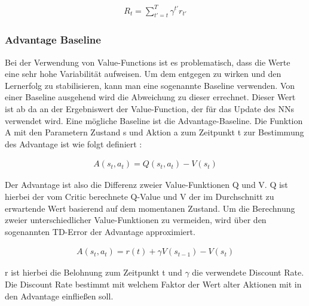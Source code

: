 \documentclass[12pt,a4paper]{article}
\begin{document}
\begin{eqnarray}
	R_{t} = \sum_{t'=t}^{T} \gamma^{t'}r_{t'}
\end{eqnarray}

\subsubsection{Advantage Baseline}
Bei der Verwendung von Value-Functions ist es problematisch, dass die Werte eine sehr hohe Variabilität aufweisen. Um dem entgegen zu wirken und den Lernerfolg zu stabilisieren, kann man eine sogenannte Baseline verwenden. Von einer Baseline ausgehend wird die Abweichung zu dieser errechnet. Dieser Wert ist ab da an der Ergebniswert der Value-Function, der für das Update des NNs verwendet wird. Eine mögliche Baseline ist die Advantage-Baseline. Die Funktion A mit den Parametern Zustand s und Aktion a zum Zeitpunkt t zur Bestimmung des Advantage ist wie folgt definiert \cite{towardsdatascience:actor_critic}:

\begin{eqnarray}
	A(s_{t}, a_{t}) = Q(s_{t}, a_{t}) - V(s_{t})
\end{eqnarray}

Der Advantage ist also die Differenz zweier Value-Funktionen Q und V. Q ist hierbei der vom Critic berechnete Q-Value und V der im Durchschnitt zu erwartende Wert basierend auf dem momentanen Zustand. Um die Berechnung zweier unterschiedlicher Value-Funktionen zu vermeiden, wird über den sogenannten TD-Error der Advantage approximiert.

\begin{eqnarray}
	A(s_{t}, a_{t}) = r(t) + \gamma V(s_{t-1}) - V(s_{t})
\end{eqnarray}

r ist hierbei die Belohnung zum Zeitpunkt t und $\gamma$ die verwendete Discount Rate. Die Discount Rate bestimmt mit welchem Faktor der Wert alter Aktionen mit in den Advantage einfließen soll.
\end{document}
